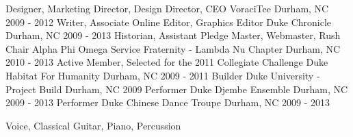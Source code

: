 \pagebreak[4]
\begin{cventries}
    \cventry
        {Designer, Marketing Director, Design Director, CEO}
        {VoraciTee}
        {Durham, NC}
        {2009 - 2012}
    \cventry
        {Writer, Associate Online Editor, Graphics Editor}
        {Duke Chronicle}
        {Durham, NC}
        {2009 - 2013}
    \cventry
        {Historian, Assistant Pledge Master, Webmaster, Rush Chair}
        {Alpha Phi Omega Service Fraternity - Lambda Nu Chapter}
        {Durham, NC}
        {2010 - 2013}
    \cventry
        {Active Member, Selected for the 2011 Collegiate Challenge}
        {Duke Habitat For Humanity}
        {Durham, NC}
        {2009 - 2011}
    \cventry
        {Builder}
        {Duke University - Project Build}
        {Durham, NC}
        {2009}
    \nopagebreak
    \cventry
        {Performer}
        {Duke Djembe Ensemble}
        {Durham, NC}
        {2009 - 2013}
    \cventry
        {Performer}
        {Duke Chinese Dance Troupe}
        {Durham, NC}
        {2009 - 2013}
    \begin{cvskills}
                {Voice, Classical Guitar, Piano, Percussion}
    \end{cvskills}
    \cventry
\end{cventries}
